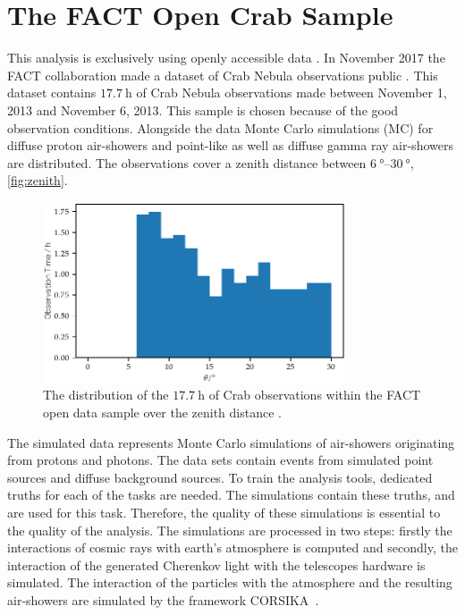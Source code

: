 \chapter{The FACT Open Crab Sample}
%
This analysis is exclusively using openly accessible data \cite{fact-data}. In November 2017 the
FACT collaboration made a dataset of Crab Nebula observations public
\cite{FACT-Design, FACT-Calib}. This dataset contains $\SI{17.7}{\hour}$
of Crab Nebula observations made between November 1, 2013 and November 6, 2013.
This sample is chosen because of the good observation conditions. Alongside the
data Monte Carlo simulations (MC) for diffuse proton air-showers and point-like
as well as diffuse gamma ray air-showers are distributed. The observations
cover a zenith distance between $\SIrange{6}{30}{\degree}$, \autoref{fig:zenith}.
%
\begin{figure}
  \centering%
  \includegraphics[width=0.8\textwidth]{Plots/zenith.pdf}%
  \caption{The distribution of the $\SI{17.7}{\hour}$ of Crab observations within the FACT open data sample over the zenith distance \cite{fact-data}.}%
  \label{fig:zenith}%
\end{figure}
%
The simulated data represents Monte Carlo simulations of air-showers
originating from protons and photons. The data sets contain events from
simulated point sources and diffuse background sources. To train the analysis
tools, dedicated truths for each of the tasks are needed. The simulations
contain these truths, and are used for this task. Therefore, the quality of
these simulations is essential to the quality of the analysis. The simulations
are processed in two steps: firstly the interactions of cosmic rays with earth's
atmosphere is computed and secondly, the interaction of the generated Cherenkov
light with the telescopes hardware is simulated. The interaction of the particles with the atmosphere and the resulting air-showers are simulated by the framework CORSIKA~\cite{CORSIKA}.

